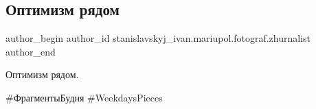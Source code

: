  
 
 
 
 

\subsection{Оптимизм рядом}
\label{sec:06_05_2020.fb.stanislavskyj_ivan.mariupol.fotograf.zhurnalist.1.optimizm_rjadom}

\ifcmt
 author_begin
   author_id stanislavskyj_ivan.mariupol.fotograf.zhurnalist
 author_end
\fi

Оптимизм рядом.

\#ФрагментыБудня \#WeekdaysPieces
